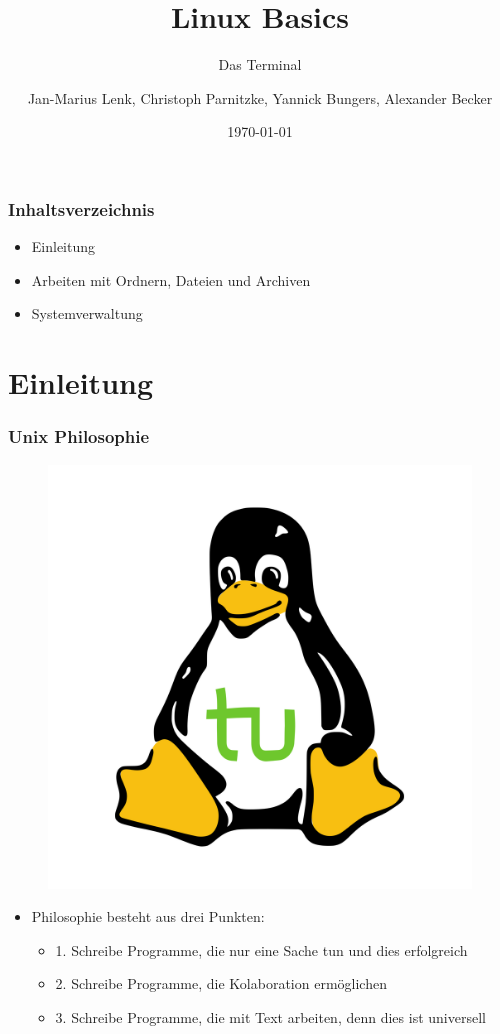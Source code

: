 \documentclass[12pt,utf8]{beamer}
\title{Linux Basics}
\subtitle{Das Terminal}
\author[J.-M. Lenk, C. Parnitzke, Y. Bungers, A. Becker]{Jan-Marius Lenk, Christoph Parnitzke, Yannick Bungers, Alexander Becker}
\institute[FOSS AG]{Free and Open Source Software AG\\ Fakultät für Informatik}
\date{\today}
\begin{document}
\titlepage

\begin{frame}
\frametitle{Inhaltsverzeichnis}
\begin{itemize}
	\item Einleitung
	\item Arbeiten mit Ordnern, Dateien und Archiven
	\item Systemverwaltung
\end{itemize}
\end{frame}

\section{Einleitung}
\begin{frame}
\frametitle{Unix Philosophie}
\begin{figure}
\includegraphics[scale=0.15]{res/tuX_tu.png}
\end{figure}
\begin{itemize}
	\item Philosophie besteht aus drei Punkten:
	\begin{itemize}
		\item 1. Schreibe Programme, die nur eine Sache tun und dies erfolgreich
		\item 2. Schreibe Programme, die Kolaboration ermöglichen
		\item 3. Schreibe Programme, die mit Text arbeiten, denn dies ist universell
	\end{itemize}
\end{itemize}
\end{frame}
\end{document}
